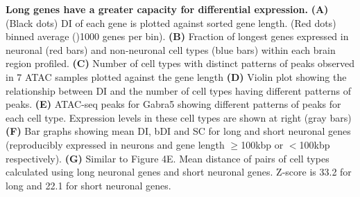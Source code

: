 \textbf{Long genes have a greater capacity for differential expression.}
\textbf{(A)} (Black dots) DI of each gene is plotted against sorted gene length. (Red dots) binned average ()1000 genes per bin).
\textbf{(B)} Fraction of longest genes expressed in neuronal (red bars) and non-neuronal cell types (blue bars) within each brain region profiled.
\textbf{(C)} Number of cell types with distinct patterns of peaks observed in 7 ATAC samples plotted against the gene length
\textbf{(D)} Violin plot showing the relationship between DI and the number of cell types having different patterns of peaks. 
\textbf{(E)} ATAC-seq peaks for Gabra5 showing different patterns of peaks for each cell type. Expression levels in these cell types are shown at right (gray bars)
\textbf{(F)} Bar graphs showing mean DI, bDI and SC for long and short neuronal genes (reproducibly expressed in neurons and gene length $\geq$100kbp or $<$100kbp respectively). 
\textbf{(G)} Similar to Figure 4E. Mean distance of pairs of cell types calculated using long neuronal genes and short neuronal genes. Z-score is 33.2 for long and 22.1 for short neuronal genes. 
